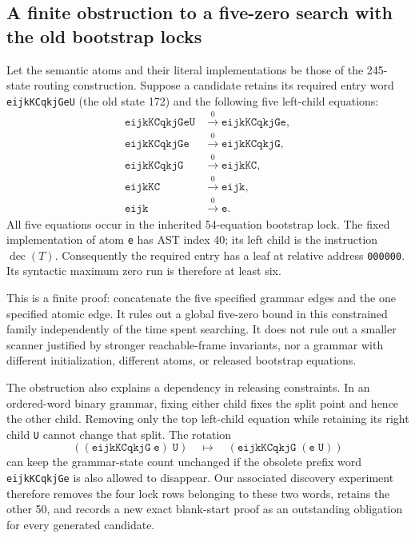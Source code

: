 \subsection{A finite obstruction to a five-zero search with the old bootstrap locks}

Let the semantic atoms and their literal implementations be those of the
245-state routing construction.  Suppose a candidate retains its required
entry word \texttt{eijkKCqkjGeU} (the old state 172) and the following five
left-child equations:
\begin{align*}
\texttt{eijkKCqkjGeU}&\xrightarrow{0}\texttt{eijkKCqkjGe},\\
\texttt{eijkKCqkjGe}&\xrightarrow{0}\texttt{eijkKCqkjG},\\
\texttt{eijkKCqkjG}&\xrightarrow{0}\texttt{eijkKC},\\
\texttt{eijkKC}&\xrightarrow{0}\texttt{eijk},\\
\texttt{eijk}&\xrightarrow{0}\texttt{e}.
\end{align*}
All five equations occur in the inherited 54-equation bootstrap lock.
The fixed implementation of atom \texttt{e} has AST index 40; its left
child is the instruction \(\operatorname{dec}(T)\).  Consequently the
required entry has a leaf at relative address \texttt{000000}.  Its
syntactic maximum zero run is therefore at least six.

This is a finite proof: concatenate the five specified grammar edges and
the one specified atomic edge.  It rules out a global five-zero bound in
this constrained family independently of the time spent searching.  It
does not rule out a smaller scanner justified by stronger reachable-frame
invariants, nor a grammar with different initialization, different atoms,
or released bootstrap equations.

The obstruction also explains a dependency in releasing constraints.  In
an ordered-word binary grammar, fixing either child fixes the split point
and hence the other child.  Removing only the top left-child equation
while retaining its right child \texttt{U} cannot change that split.  The
rotation
\[
 ((\texttt{eijkKCqkjG}\;\texttt{e})\;\texttt{U})
 \quad\longmapsto\quad
 (\texttt{eijkKCqkjG}\;(\texttt{e}\;\texttt{U}))
\]
can keep the grammar-state count unchanged if the obsolete prefix word
\texttt{eijkKCqkjGe} is also allowed to disappear.  Our associated
discovery experiment therefore removes the four lock rows belonging to
these two words, retains the other 50, and records a new exact blank-start
proof as an outstanding obligation for every generated candidate.
